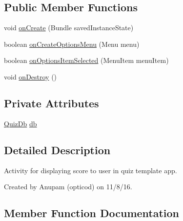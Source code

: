 \subsection*{Public Member Functions}
\begin{DoxyCompactItemize}
\item 
void \hyperlink{classorg_1_1buildmlearn_1_1quiztime_1_1activities_1_1LastActivity_a8b593c4522abb2b146805f5ba8f62dfc}{on\+Create} (Bundle saved\+Instance\+State)
\item 
boolean \hyperlink{classorg_1_1buildmlearn_1_1quiztime_1_1activities_1_1LastActivity_a1245c1c6a4ebc45940e71a4e93ac7fbc}{on\+Create\+Options\+Menu} (Menu menu)
\item 
boolean \hyperlink{classorg_1_1buildmlearn_1_1quiztime_1_1activities_1_1LastActivity_ae1b7806d62fe282523718af2a63133ac}{on\+Options\+Item\+Selected} (Menu\+Item menu\+Item)
\item 
void \hyperlink{classorg_1_1buildmlearn_1_1quiztime_1_1activities_1_1LastActivity_a9d4d59297d9277ef368c52463592e98c}{on\+Destroy} ()
\end{DoxyCompactItemize}
\subsection*{Private Attributes}
\begin{DoxyCompactItemize}
\item 
\hyperlink{classorg_1_1buildmlearn_1_1quiztime_1_1data_1_1QuizDb}{Quiz\+Db} \hyperlink{classorg_1_1buildmlearn_1_1quiztime_1_1activities_1_1LastActivity_a29fedb2a5350c0f4a90f4650a2aff1e8}{db}
\end{DoxyCompactItemize}


\subsection{Detailed Description}
Activity for displaying score to user in quiz template app. 

Created by Anupam (opticod) on 11/8/16. 

\subsection{Member Function Documentation}
